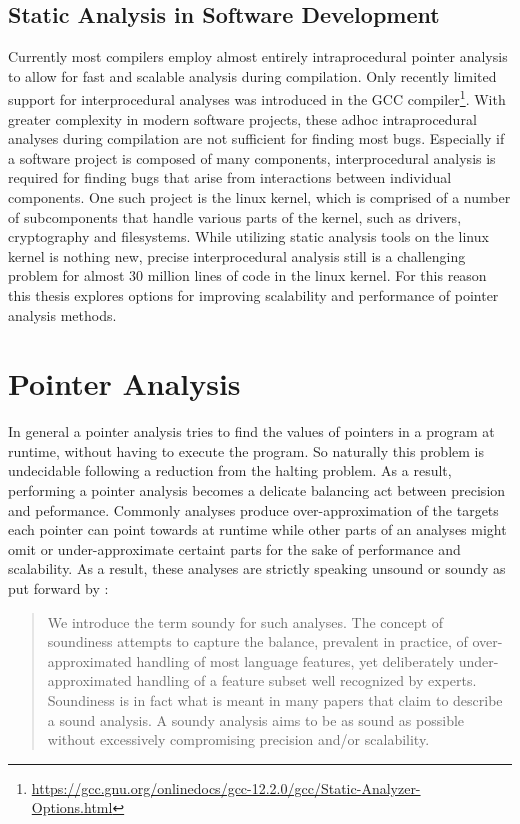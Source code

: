 \subsection{Static Analysis in Software Development}
Currently most compilers employ almost entirely intraprocedural pointer analysis to allow for fast and scalable analysis during compilation. Only recently limited support for interprocedural analyses was introduced in the GCC compiler\footnote{\url{https://gcc.gnu.org/onlinedocs/gcc-12.2.0/gcc/Static-Analyzer-Options.html}}.
With greater complexity in modern software projects, these adhoc intraprocedural analyses during compilation are not sufficient for finding most bugs.
Especially if a software project is composed of many components, interprocedural analysis is required for finding bugs that arise from interactions between individual components.
One such project is the linux kernel, which is comprised of a number of subcomponents that handle various parts of the kernel, such as drivers, cryptography and filesystems.
While utilizing static analysis tools on the linux kernel is nothing new, precise interprocedural analysis still is a challenging problem for almost 30 million lines of code in the linux kernel.
For this reason this thesis explores options for improving scalability and performance of pointer analysis methods.

\section{Pointer Analysis}\label{sec:pta}
In general a pointer analysis tries to find the values of pointers in a program at runtime, without having to execute the program.
So naturally this problem is undecidable \cite{landi1992undecidability} following a reduction from the halting problem.
As a result, performing a pointer analysis becomes a delicate balancing act between precision and peformance.
Commonly analyses produce over-approximation of the targets each pointer can point towards at runtime while other parts of an analyses might omit or under-approximate certaint parts for the sake of performance and scalability.
As a result, these analyses are strictly speaking unsound or soundy as put forward by \cite{livshits2015defense}:

\begin{quote}
    We introduce the term soundy for
    such analyses. The concept of soundiness
    attempts to capture the balance,
    prevalent in practice, of over-approximated
    handling of most language features, yet deliberately
    under-approximated handling of a feature subset well
    recognized by experts. Soundiness is in
    fact what is meant in many papers that
    claim to describe a sound analysis. A
    soundy analysis aims to be as sound as
    possible without excessively compromising
    precision and/or scalability.
\end{quote}

